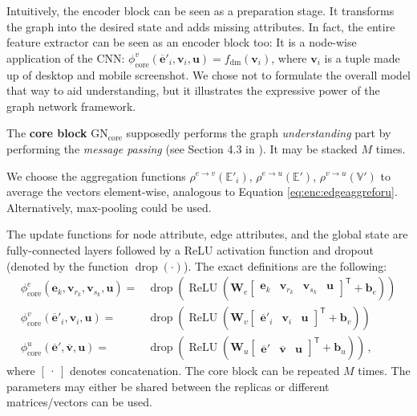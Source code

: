 Intuitively, the encoder block can be seen as a preparation stage. It transforms the graph into the desired state and adds missing attributes. In fact, the entire feature extractor can be seen as an encoder block too: It is a node-wise application of the CNN: $\phi^v_\text{core}\left(\bm{\overline{e}}'_i,\bm{v}_i,\bm{u}\right)=f_\text{dm}(\bm{v}_i)$, where $\bm{v}_i$ is a tuple made up of desktop and mobile screenshot. We chose not to formulate the overall model that way to aid understanding, but it illustrates the expressive power of the graph network framework.

The \textbf{core block} $\text{GN}_\text{core}$ supposedly performs the graph \textit{understanding} part by performing the \textit{message passing} (see Section 4.3 in \cite{deepmind:graphnets}). It may be stacked $M$ times. 

We choose the aggregation functions $\rho^{e\rightarrow v}\left(\mathbb{E}'_i\right)$, $\rho^{e\rightarrow u}\left(\mathbb{E}'\right)$, $\rho^{v\rightarrow u}\left(\mathbb{V}'\right)$ to average the vectors element-wise, analogous to Equation \ref{eq:enc:edgeaggreforu}. Alternatively, max-pooling could be used.

The update functions for node attribute, edge attributes, and the global state are fully-connected layers followed by a ReLU activation function and dropout (denoted by the function $\operatorname{drop}(\cdot)$). The exact definitions are the following:
\begin{align}
    \phi^e_\text{core}\left(\bm{e}_k,\bm{v}_{r_k},\bm{v}_{s_k},\bm{u}\right)=&
        \operatorname{drop}\left(\operatorname{ReLU}\left(
            \bm{W}_e\begin{bmatrix}\bm{e}_k & \bm{v}_{r_k} & \bm{v}_{s_k} & \bm{u}\end{bmatrix}^\mathsf{T}+\bm{b}_e
        \right)\right)\\
    \phi^v_\text{core}\left(\bm{\overline{e}}'_i,\bm{v}_i,\bm{u}\right)=&
        \operatorname{drop}\left(\operatorname{ReLU}\left(
            \bm{W}_v\begin{bmatrix}\bm{\overline{e}}'_i & \bm{v}_i & \bm{u}\end{bmatrix}^\mathsf{T}+\bm{b}_v
        \right)\right)\\
    \phi^u_\text{core}\left(\bm{\overline{e}}',\bm{\overline{v}},\bm{u}\right)=&
        \operatorname{drop}\left(\operatorname{ReLU}\left(
            \bm{W}_u\begin{bmatrix}\bm{\overline{e}}' & \bm{\overline{v}} & \bm{u}\end{bmatrix}^\mathsf{T}+\bm{b}_u
        \right)\right)\,,
\end{align}where $\begin{bmatrix}\cdot\end{bmatrix}$ denotes concatenation. The core block can be repeated $M$ times. The parameters may either be shared between the replicas or different matrices/vectors can be used.

